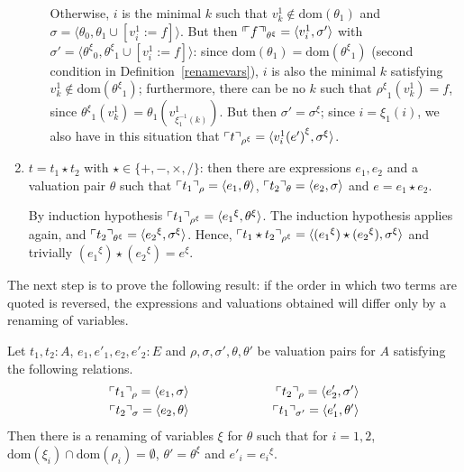 \documentclass[numreferences]{kluwer}
\newcommand{\mlfnv}[2]{\ensuremath\ulcorner\!\!\ulcorner{#1}\urcorner\!\!\urcorner_{#2}}
\newcommand{\mlfn}[2]{\ensuremath\ulcorner{#1}\urcorner_{#2}}
\newcommand{\domain}{\ensuremath{\mathrm{dom}}}
\newcommand{\renamevar}[2]{\ensuremath{{#1}^{#2}}}
\newcommand{\isrenamevar}[3]{\ensuremath{{#1}=\renamevar{#2}{#3}}}
\begin{document}
\begin{article}
\begin{pf}
\begin{enumerate}
\begin{enumerate}
Otherwise, $i$ is the minimal $k$ such that $v^1_k\not\in\domain(\theta_1)$
and $\sigma=\langle\theta_0,\theta_1\cup[v^1_i:=f]\rangle$.
But then $\mlfnv{f}{\renamevar\theta\xi}=\langle v^1_i,\sigma'\rangle$ with
$\sigma'=\langle\renamevar\theta\xi_0,\renamevar\theta\xi_1\cup[v^1_i:=f]\rangle$:
since $\domain(\theta_1)=\domain(\renamevar\theta\xi_1)$ (second condition in
Definition~\ref{renamevars}), $i$ is also the minimal $k$
satisfying $v^1_k\not\in\domain(\renamevar\theta\xi_1)$; furthermore, there can be no
$k$ such that $\renamevar\rho\xi_1(v^1_k)=f$, since
$\renamevar\theta\xi_1(v^1_k)=\theta_1(v^1_{\xi^{-1}_1(k)})$.
But then {\isrenamevar{\sigma'}\sigma\xi}; since $i=\xi_1(i)$,
we also have in this situation that
$\mlfn{t}{\renamevar\rho\xi}=\langle\renamevar{v^1_i(e')}\xi,\renamevar\sigma\xi\rangle$.
\end{enumerate}
\item $t=t_1\star t_2$ with $\star\in\{+,-,\times,/\}$: then there are
expressions $e_1,e_2$ and a valuation pair $\theta$ such that
$\mlfn{t_1}{\rho}=\langle e_1,\theta\rangle$,
$\mlfn{t_2}{\theta}=\langle e_2,\sigma\rangle$ and $e=e_1\star e_2$.

By induction hypothesis $\mlfn{t_1}{\renamevar\rho\xi}=%
\langle\renamevar{e_1}\xi,\renamevar\theta\xi\rangle$.
The induction hypothesis applies again, and
$\mlfn{t_2}{\renamevar\theta\xi}=\langle\renamevar{e_2}\xi,%
\renamevar\sigma\xi\rangle$.  Hence, $\mlfn{t_1\star t_2}{\renamevar\rho\xi}=%
\langle(\renamevar{e_1}\xi)\star(\renamevar{e_2}\xi),%
\renamevar\sigma\xi\rangle$ and trivially
$(\renamevar{e_1}\xi)\star(\renamevar{e_2}\xi)=\renamevar e\xi$.
\end{enumerate}
\end{pf}

The next step is to prove the following result: if the order in which two
terms are quoted is reversed, the expressions and valuations obtained
will differ only by a renaming of variables.
\begin{lemma}\label{quotecommutes}
Let $t_1,t_2:A$, $e_1,e'_1,e_2,e'_2:E$ and
$\rho,\sigma,\sigma',\theta,\theta'$ be valuation pairs for $A$
satisfying the following relations.
\begin{eqnarray*}
\mlfn{t_1}{\rho} = \langle e_1,\sigma\rangle
 & \hspace{2cm} & \mlfn{t_2}{\rho} = \langle e'_2,\sigma'\rangle\\
\mlfn{t_2}{\sigma} = \langle e_2,\theta\rangle
 && \mlfn{t_1}{\sigma'} = \langle e'_1,\theta'\rangle
\end{eqnarray*}
Then there is a renaming of variables $\xi$ for $\theta$ such that
 for $i=1,2$, $\domain(\xi_i)\cap\domain(\rho_i)=\emptyset$,
{\isrenamevar{\theta'}\theta\xi} and {\isrenamevar{e'_i}{e_i}\xi}.
\end{lemma}


\end{article}
\end{document}
